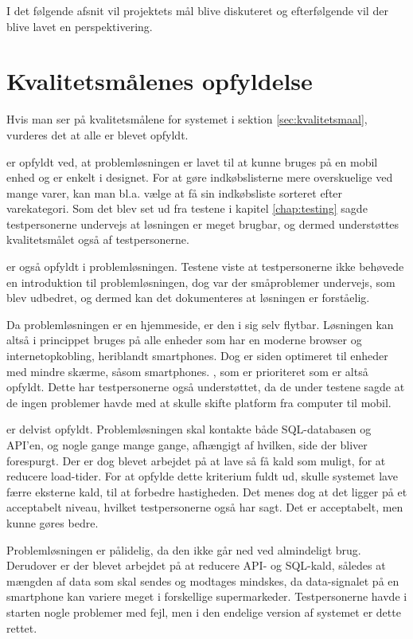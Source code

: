 I det følgende afsnit vil projektets mål blive diskuteret og efterfølgende vil der blive lavet en perspektivering.
\section{Kvalitetsmålenes opfyldelse}
Hvis man ser på kvalitetsmålene for systemet i sektion \ref{sec:kvalitetsmaal}, vurderes det at alle er blevet opfyldt.

 er opfyldt ved, at problemløsningen er lavet til at kunne bruges på en mobil enhed og er enkelt i designet. For at gøre indkøbslisterne mere overskuelige ved mange varer, kan man bl.a. vælge at få sin indkøbsliste sorteret efter varekategori. Som det blev set ud fra testene i kapitel \ref{chap:testing} sagde testpersonerne undervejs at løsningen er meget brugbar, og dermed understøttes kvalitetsmålet også af testpersonerne.

 er også opfyldt i problemløsningen. Testene viste at testpersonerne ikke behøvede en introduktion til problemløsningen, dog var der småproblemer undervejs, som blev udbedret, og dermed kan det dokumenteres at løsningen er forståelig.

Da problemløsningen er en hjemmeside, er den i sig selv flytbar. Løsningen kan altså i princippet bruges på alle enheder som har en moderne browser og internetopkobling, heriblandt smartphones. Dog er siden optimeret til enheder med mindre skærme, såsom smartphones. , som er prioriteret som  er altså opfyldt. Dette har testpersonerne også understøttet, da de under testene sagde at de ingen problemer havde med at skulle skifte platform fra computer til mobil.

 er delvist opfyldt. Problemløsningen skal kontakte både SQL-databasen og API'en, og nogle gange mange gange, afhængigt af hvilken, side der bliver forespurgt. Der er dog blevet arbejdet på at lave så få kald som muligt, for at reducere load-tider. For at opfylde dette kriterium fuldt ud, skulle systemet lave færre eksterne kald, til at forbedre hastigheden. Det menes dog at det ligger på et acceptabelt niveau, hvilket testpersonerne også har sagt. Det er acceptabelt, men kunne gøres bedre.

Problemløsningen er pålidelig, da den ikke går ned ved almindeligt brug. Derudover er der blevet arbejdet på at reducere API- og SQL-kald, således at mængden af data som skal sendes og modtages mindskes, da data-signalet på en smartphone kan variere meget i forskellige supermarkeder. Testpersonerne havde i starten nogle problemer med fejl, men i den endelige version af systemet er dette rettet.

